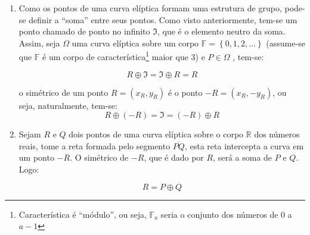 \documentclass[14pt, oneside]{book}
\theoremstyle{definition}
\begin{document}
                \begin{enumerate}
                    \item Como os pontos de uma curva elíptica formam uma estrutura de grupo, pode-se definir a ``soma'' entre seus pontos. Como visto anteriormente, tem-se um ponto chamado de ponto no infinito ${\Im}$, que é o elemento neutro da soma. Assim, seja $\Omega$ uma curva elíptica sobre um corpo $\mathbb{F} = \left\{ 0,1,2,...\right\}$ (assume-se que $\mathbb{F}$ é um corpo de característica\footnote{Característica é ``módulo'', ou seja, $\mathbb{F}_{a}$ seria o conjunto dos números de $0$ a $a-1$} maior que 3) e $P\in \Omega$ , tem-se:
                        
                    $$R \oplus {\Im} = {\Im} \oplus R= R$$
                    
                    o simétrico de um ponto $R= (x_R, y_R)$ é o ponto $-R = (x_R, -y_R)$, ou seja, naturalmente, tem-se:
                    $$R \oplus (-R) = {\Im} = (-R) \oplus R$$

                    \item Sejam $R$ e $Q$ dois pontos de uma curva elíptica sobre o corpo $\mathbb{R}$ dos números reais, tome a reta formada pelo segmento $\overline{PQ}$, esta reta intercepta a curva em um ponto $-R$. O simétrico de $-R$, que é dado por $R$, será a soma de $P$ e $Q$. Logo:
                        
                    $$R = P \oplus Q$$
                        

\end{enumerate}
\end{document}
